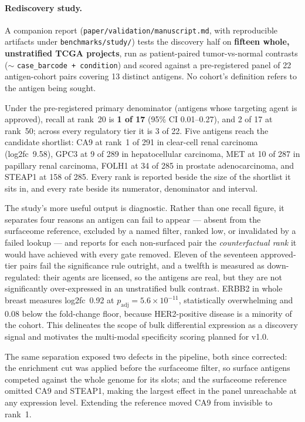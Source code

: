\documentclass[11pt,letterpaper]{article}
\begin{document}
\paragraph{Rediscovery study.} A companion report
(\texttt{paper/validation/manuscript.md}, with reproducible artifacts under
\texttt{benchmarks/study/}) tests the discovery half on \textbf{fifteen whole,
unstratified TCGA projects}, run as patient-paired tumor-vs-normal contrasts
($\sim$ \texttt{case\_barcode + condition}) and scored against a pre-registered
panel of 22 antigen-cohort pairs covering 13 distinct antigens. No cohort's
definition refers to the antigen being sought.

Under the pre-registered primary denominator (antigens whose targeting agent is
approved), recall at rank~20 is \textbf{1 of 17} (95\% CI 0.01--0.27), and 2 of
17 at rank~50; across every regulatory tier it is 3 of 22. Five antigens reach
the candidate shortlist: CA9 at rank~1 of 291 in clear-cell renal carcinoma
(log2fc~9.58), GPC3 at 9 of 289 in hepatocellular carcinoma, MET at 10 of 287 in
papillary renal carcinoma, FOLH1 at 34 of 285 in prostate adenocarcinoma, and
STEAP1 at 158 of 285. Every rank is reported beside the size of the shortlist it
sits in, and every rate beside its numerator, denominator and interval.

The study's more useful output is diagnostic. Rather than one recall figure, it
separates four reasons an antigen can fail to appear --- absent from the
surfaceome reference, excluded by a named filter, ranked low, or invalidated by a
failed lookup --- and reports for each non-surfaced pair the \textit{counterfactual
rank} it would have achieved with every gate removed. Eleven of the seventeen
approved-tier pairs fail the significance rule outright, and a twelfth is
measured as down-regulated: their agents are
licensed, so the antigens are real, but they are not significantly over-expressed
in an unstratified bulk contrast. ERBB2 in whole breast measures log2fc~0.92 at
$p_{\mathrm{adj}}\!=\!5.6\times10^{-11}$, statistically overwhelming and 0.08
below the fold-change floor, because HER2-positive disease is a minority of the
cohort. This delineates the scope of bulk differential expression as a discovery
signal and motivates the multi-modal specificity scoring planned for v1.0.

The same separation exposed two defects in the pipeline, both since corrected:
the enrichment cut was applied before the surfaceome filter, so surface antigens
competed against the whole genome for its slots; and the surfaceome reference
omitted CA9 and STEAP1, making the largest effect in the panel unreachable at any
expression level. Extending the reference moved CA9 from invisible to rank~1.
\end{document}
